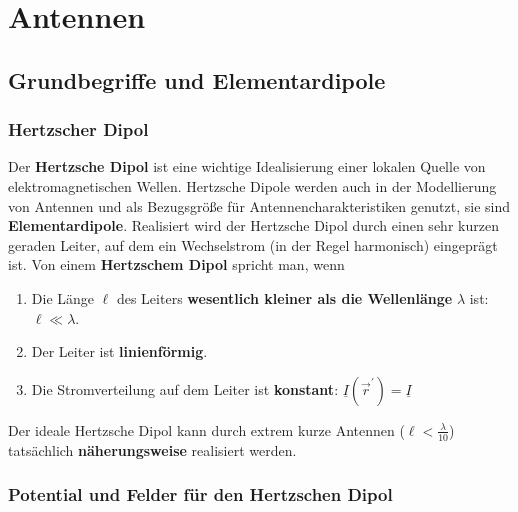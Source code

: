 \chapter{Antennen}
 \section{Grundbegriffe und Elementardipole}
 \subsection{Hertzscher Dipol}
	  \begin{center}
		  
	  \end{center}
		  Der \textbf{Hertzsche Dipol} ist eine wichtige Idealisierung einer lokalen Quelle von elektromagnetischen Wellen. Hertzsche Dipole werden auch in der Modellierung von Antennen und als Bezugsgröße für Antennencharakteristiken genutzt, sie sind \textbf{Elementardipole}. Realisiert wird der Hertzsche Dipol durch einen sehr kurzen geraden Leiter, auf dem ein Wechselstrom (in der Regel harmonisch) eingeprägt ist. Von einem \textbf{Hertzschem Dipol} spricht man, wenn
		  \begin{enumerate}
		  	\item Die Länge \(\ell\) des Leiters \textbf{wesentlich kleiner als die Wellenlänge} \(\lambda\) ist: \(\ell \ll \lambda\).
		  	\item Der Leiter ist \textbf{linienförmig}.
		  	\item Die Stromverteilung auf dem Leiter ist \textbf{konstant}: \(\underline{I}(\vec{r}^\prime ) = \underline{I} \)
		  \end{enumerate}
		  Der ideale Hertzsche Dipol kann durch extrem kurze Antennen (\(\ell < \frac{\lambda}{10}\)) tatsächlich \textbf{näherungsweise} realisiert werden.
		  \subsection{Potential und Felder für den Hertzschen Dipol}
